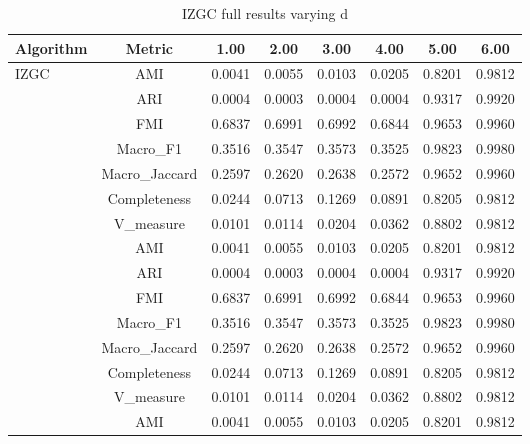 \begin{table}[ht!]
\centering
\caption{IZGC full results varying d}
\label{tab:izgc_overlap_d_full}
\begin{tabular*}{\linewidth}{@{} lc c c c c c c @{}}
\toprule
Algorithm & Metric & 1.00 & 2.00 & 3.00 & 4.00 & 5.00 & 6.00 \\
\midrule
\multirow{7}{*}{IZGC}
 & AMI  & 0.0041 & 0.0055 & 0.0103 & 0.0205 & 0.8201 & 0.9812 \\

 & ARI  & 0.0004 & 0.0003 & 0.0004 & 0.0004 & 0.9317 & 0.9920 \\

 & FMI  & 0.6837 & 0.6991 & 0.6992 & 0.6844 & 0.9653 & 0.9960 \\

 & Macro_F1  & 0.3516 & 0.3547 & 0.3573 & 0.3525 & 0.9823 & 0.9980 \\

 & Macro_Jaccard  & 0.2597 & 0.2620 & 0.2638 & 0.2572 & 0.9652 & 0.9960 \\

 & Completeness  & 0.0244 & 0.0713 & 0.1269 & 0.0891 & 0.8205 & 0.9812 \\

 & V_measure  & 0.0101 & 0.0114 & 0.0204 & 0.0362 & 0.8802 & 0.9812 \\
\addlinespace
\multirow{7}{*}{IZGC}
 & AMI  & 0.0041 & 0.0055 & 0.0103 & 0.0205 & 0.8201 & 0.9812 \\

 & ARI  & 0.0004 & 0.0003 & 0.0004 & 0.0004 & 0.9317 & 0.9920 \\

 & FMI  & 0.6837 & 0.6991 & 0.6992 & 0.6844 & 0.9653 & 0.9960 \\

 & Macro_F1  & 0.3516 & 0.3547 & 0.3573 & 0.3525 & 0.9823 & 0.9980 \\

 & Macro_Jaccard  & 0.2597 & 0.2620 & 0.2638 & 0.2572 & 0.9652 & 0.9960 \\

 & Completeness  & 0.0244 & 0.0713 & 0.1269 & 0.0891 & 0.8205 & 0.9812 \\

 & V_measure  & 0.0101 & 0.0114 & 0.0204 & 0.0362 & 0.8802 & 0.9812 \\
\addlinespace
\multirow{7}{*}{IZGC}
 & AMI  & 0.0041 & 0.0055 & 0.0103 & 0.0205 & 0.8201 & 0.9812 \\


\end{tabular*}
\end{table}
